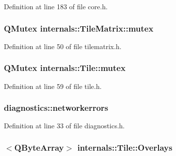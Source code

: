Definition at line 183 of file core.\-h.

\hypertarget{group___o_p_map_widget_gae5c51dfc2c2d290c958e335bef18f0a1}{
\subsubsection[{mutex}]{\setlength{\rightskip}{0pt plus 5cm}Q\-Mutex internals\-::\-Tile\-Matrix\-::mutex\hspace{0.3cm}{\ttfamily [protected]}}}\label{group___o_p_map_widget_gae5c51dfc2c2d290c958e335bef18f0a1}


Definition at line 50 of file tilematrix.\-h.

\hypertarget{group___o_p_map_widget_gadfb1115a74bee691ed9d70c97b727ef7}{
\subsubsection[{mutex}]{\setlength{\rightskip}{0pt plus 5cm}Q\-Mutex internals\-::\-Tile\-::mutex\hspace{0.3cm}{\ttfamily [protected]}}}\label{group___o_p_map_widget_gadfb1115a74bee691ed9d70c97b727ef7}


Definition at line 59 of file tile.\-h.

\hypertarget{group___o_p_map_widget_ga818b2b21d317fac5193b04d2c0e32c82}{
\subsubsection[{networkerrors}]{ diagnostics\-::networkerrors}}\label{group___o_p_map_widget_ga818b2b21d317fac5193b04d2c0e32c82}


Definition at line 33 of file diagnostics.\-h.

\hypertarget{group___o_p_map_widget_ga45369aa8480e3bd7ff5c6a6017573361}{
\subsubsection[{Overlays}]{$<$Q\-Byte\-Array$>$ internals\-::\-Tile\-::\-Overlays}}\label{group___o_p_map_widget_ga45369aa8480e3bd7ff5c6a6017573361}


